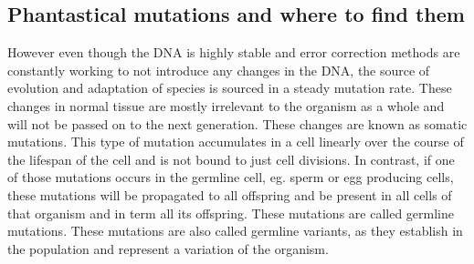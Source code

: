 \subsection[Mutations]{Phantastical mutations and where to find them}
However even though the DNA is highly stable and error correction methods are constantly working to not introduce any changes in the DNA, the source of evolution and adaptation of species is sourced in a steady mutation rate. These changes in normal tissue are mostly irrelevant to the organism as a whole and will not be passed on to the next generation. These changes are known as somatic mutations. This type of mutation accumulates in a cell linearly over the course of the lifespan of the cell and is not bound to just cell divisions\cite{Alexandrov2015,Moore2021}. 
In contrast, if one of those mutations occurs in the germline cell, eg. sperm or egg producing cells, these mutations will be propagated to all offspring and be present in all cells of that organism and in term all its offspring. These mutations are called germline mutations. These mutations are also called germline variants, as they establish in the population and represent a variation of the organism.